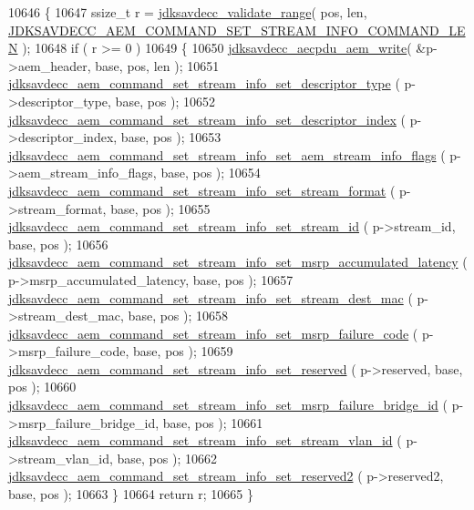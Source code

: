 \begin{DoxyCode}
10646 \{
10647     ssize\_t r = \hyperlink{group__util_ga9c02bdfe76c69163647c3196db7a73a1}{jdksavdecc\_validate\_range}( pos, len, 
      \hyperlink{group__command__set__stream__info_ga07fbd87fc77d6b4b2bd0b4e05900729d}{JDKSAVDECC\_AEM\_COMMAND\_SET\_STREAM\_INFO\_COMMAND\_LEN} );
10648     \textcolor{keywordflow}{if} ( r >= 0 )
10649     \{
10650         \hyperlink{group__aecpdu__aem_gad658e55771cce77cecf7aae91e1dcbc5}{jdksavdecc\_aecpdu\_aem\_write}( &p->aem\_header, base, pos, len );
10651         \hyperlink{group__command__set__stream__info_ga70c665181f5ec46124dd18debe6d4f23}{jdksavdecc\_aem\_command\_set\_stream\_info\_set\_descriptor\_type}
      ( p->descriptor\_type, base, pos );
10652         \hyperlink{group__command__set__stream__info_ga5e3cb50545ae82c947a803613c5e688a}{jdksavdecc\_aem\_command\_set\_stream\_info\_set\_descriptor\_index}
      ( p->descriptor\_index, base, pos );
10653         \hyperlink{group__command__set__stream__info_ga0fc97d4aa9529b7aaf07d6f5d4a4792a}{jdksavdecc\_aem\_command\_set\_stream\_info\_set\_aem\_stream\_info\_flags}
      ( p->aem\_stream\_info\_flags, base, pos );
10654         \hyperlink{group__command__set__stream__info_ga4a70a7a66d1a6cf75e5e924fdbc9cd0a}{jdksavdecc\_aem\_command\_set\_stream\_info\_set\_stream\_format}
      ( p->stream\_format, base, pos );
10655         \hyperlink{group__command__set__stream__info_ga794a25f95ebd09621ac0438ca4b06a5c}{jdksavdecc\_aem\_command\_set\_stream\_info\_set\_stream\_id}
      ( p->stream\_id, base, pos );
10656         \hyperlink{group__command__set__stream__info_gadd7a760f1d47f548619b12744c2ca631}{jdksavdecc\_aem\_command\_set\_stream\_info\_set\_msrp\_accumulated\_latency}
      ( p->msrp\_accumulated\_latency, base, pos );
10657         \hyperlink{group__command__set__stream__info_ga0095e991de1df0a75ef0573edb304406}{jdksavdecc\_aem\_command\_set\_stream\_info\_set\_stream\_dest\_mac}
      ( p->stream\_dest\_mac, base, pos );
10658         \hyperlink{group__command__set__stream__info_ga80d67b8367dcec40d0dfc37700770a0f}{jdksavdecc\_aem\_command\_set\_stream\_info\_set\_msrp\_failure\_code}
      ( p->msrp\_failure\_code, base, pos );
10659         \hyperlink{group__command__set__stream__info_ga4b23b322aa6b91df885c019cd10401ef}{jdksavdecc\_aem\_command\_set\_stream\_info\_set\_reserved}
      ( p->reserved, base, pos );
10660         \hyperlink{group__command__set__stream__info_ga694d29a01530f02fa2f82944581d6da1}{jdksavdecc\_aem\_command\_set\_stream\_info\_set\_msrp\_failure\_bridge\_id}
      ( p->msrp\_failure\_bridge\_id, base, pos );
10661         \hyperlink{group__command__set__stream__info_ga9a9acf4ca20ed75b66b947184c287f49}{jdksavdecc\_aem\_command\_set\_stream\_info\_set\_stream\_vlan\_id}
      ( p->stream\_vlan\_id, base, pos );
10662         \hyperlink{group__command__set__stream__info_ga77a29f77739185bcacd16af35c41dd7d}{jdksavdecc\_aem\_command\_set\_stream\_info\_set\_reserved2}
      ( p->reserved2, base, pos );
10663     \}
10664     \textcolor{keywordflow}{return} r;
10665 \}
\end{DoxyCode}


